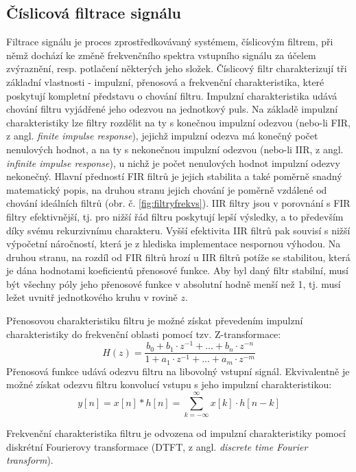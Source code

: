 \documentclass[a4paper, 12pt]{article}
\begin{document}
\subsection{Číslicová filtrace signálu} \label{sec:filtry)}
Filtrace signálu je proces zprostředkovávaný systémem, číslicovým filtrem, při němž dochází ke změně frekvenčního spektra vstupního signálu za účelem zvýraznění, resp. potlačení některých jeho složek. \cite{filtracedef}
Číslicový filtr charakterizují tři základní vlastnosti - impulzní, přenosová a frekvenční charakteristika, které poskytují kompletní představu o chování filtru. Impulzní charakteristika udává chování filtru vyjádřené jeho odezvou na jednotkový puls. Na základě impulzní charakteristiky lze filtry rozdělit na ty s konečnou  impulzní odezvou (nebo-li FIR, z angl. \textit{finite impulse response}), jejichž impulzní odezva má konečný počet nenulových hodnot, a na ty s nekonečnou impulzní odezvou (nebo-li IIR, z angl. \textit{infinite impulse response}), u nichž je počet nenulových hodnot impulzní odezvy nekonečný. Hlavní předností FIR filtrů je jejich stabilita a také poměrně snadný matematický popis, na druhou stranu jejich chování je poměrně vzdálené od chování ideálních filtrů (obr. č. \ref{fig:filtryfrekvs}). IIR filtry jsou v porovnání s FIR filtry efektivnější, tj. pro nižší řád filtru poskytují lepší výsledky, a to především díky svému rekurzivnímu charakteru. Vyšší efektivita IIR filtrů pak souvisí s nižší výpočetní náročností, která je z hlediska implementace nespornou výhodou. Na druhou stranu, na rozdíl od FIR filtrů hrozí u IIR filtrů potíže se stabilitou, která je dána hodnotami koeficientů přenosové funkce. Aby byl daný filtr stabilní, musí být všechny póly jeho přenosové funkce v absolutní hodně menší než 1, tj. musí ležet uvnitř jednotkového kruhu v rovině $z$. \cite{iir}

Přenosovou charakteristiku filtru je možné získat převedením impulzní charakteristiky do frekvenční oblasti pomocí tzv. Z-transformace:
\begin{equation}
H (z) = \frac{b_0 + b_1·z^{-1} + ... + b_n·z^{-n}}{1 + a_1·z^{-1} + ... + a_m·z^{-m}}
\end{equation}
Přenosová funkce udává odezvu filtru na libovolný vstupní signál. Ekvivalentně je možné získat odezvu filtru konvolucí vstupu s jeho impulzní charakteristikou:
\begin{equation}
y [n] = x [n] * h [n] = \sum_{k = -\infty}^{\infty} x[k]·h[n-k]
\end{equation}

\noindent Frekvenční charakteristika filtru je odvozena od impulzní charakteristiky pomocí diskrétní Fourierovy transformace (DTFT, z angl. \textit{discrete time Fourier transform}).
\end{document}
